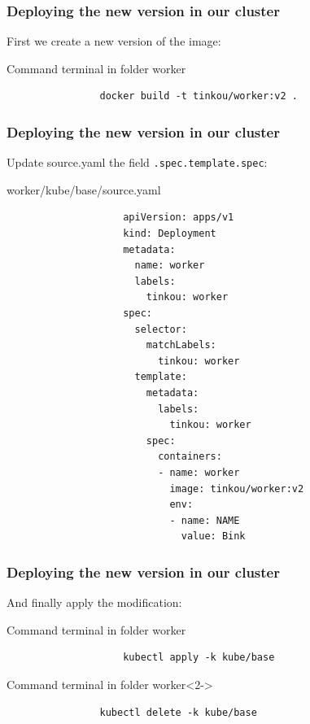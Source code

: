 	\begin{frame}[fragile]
		\frametitle{Deploying the new version in our cluster}
		
		First we create a new version of the image:
		\begin{block}{Command terminal in folder worker}
			\begin{verbatim}
				docker build -t tinkou/worker:v2 .
			\end{verbatim}
		\end{block}
	\end{frame}
	
	\begin{frame}[fragile]
		\frametitle{Deploying the new version in our cluster}
		
		Update source.yaml the field \verb!.spec.template.spec!:
		\begin{block}{worker/kube/base/source.yaml}
			\begin{tiny}
				\begin{verbatim}
					apiVersion: apps/v1
					kind: Deployment
					metadata:
					  name: worker
					  labels:
					    tinkou: worker
					spec:
					  selector:
					    matchLabels:
					      tinkou: worker
					  template:
					    metadata:
					      labels:
					        tinkou: worker
					    spec:
					      containers:
					      - name: worker
					        image: tinkou/worker:v2
					        env:
					        - name: NAME
					          value: Bink
				\end{verbatim}
			\end{tiny}
		\end{block}
	\end{frame}
	
	\begin{frame}[fragile]
		\frametitle{Deploying the new version in our cluster}
			
		And finally apply the modification:
		\begin{block}{Command terminal in folder worker}
			\begin{small}
					\begin{verbatim}
					kubectl apply -k kube/base
				\end{verbatim}
			\end{small}
		\end{block}
		
		\bigskip
		
		\begin{block}{Command terminal in folder worker}<2->
			\begin{verbatim}
				kubectl delete -k kube/base
			\end{verbatim}
		\end{block}
	\end{frame}
	

